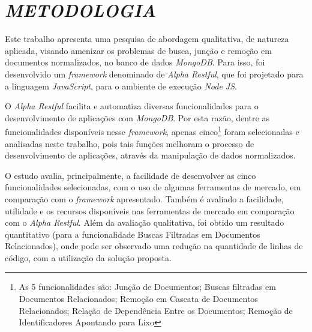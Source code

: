 \chapter{\textit{METODOLOGIA}}
\label{Metodologia}

Este trabalho apresenta uma pesquisa de abordagem qualitativa, de natureza aplicada, visando amenizar os problemas de busca, junção e remoção em documentos normalizados, no banco de dados \textit{MongoDB}. Para isso, foi desenvolvido um \textit{framework} denominado de \textit{Alpha Restful}, que foi projetado para a linguagem \textit{JavaScript}, para o ambiente de execução \textit{Node JS}.


O \textit{Alpha Restful} facilita e automatiza diversas funcionalidades para o desenvolvimento de aplicações com \textit{MongoDB}. Por esta razão, dentre as funcionalidades disponíveis nesse \textit{framework}, apenas cinco\footnote{As 5 funcionalidades são: Junção de Documentos; Buscas filtradas em Documentos Relacionados; Remoção em Cascata de Documentos Relacionados; Relação de Dependência Entre os Documentos; Remoção de Identificadores Apontando para Lixo} foram selecionadas e analisadas neste trabalho, pois tais funções melhoram o processo de desenvolvimento de aplicações, através da manipulação de dados normalizados.

O estudo avalia, principalmente, a facilidade de desenvolver as cinco funcionalidades selecionadas, com o uso de algumas ferramentas de mercado, em comparação com o \textit{framework} apresentado. Também é avaliado a facilidade, utilidade e os recursos disponíveis nas ferramentas de mercado em comparação com o \textit{Alpha Restful}. Além da avaliação qualitativa, foi obtido um resultado quantitativo (para a funcionalidade Buscas Filtradas em Documentos Relacionados), onde pode ser observado uma redução na quantidade de linhas de código, com a utilização da solução proposta.

